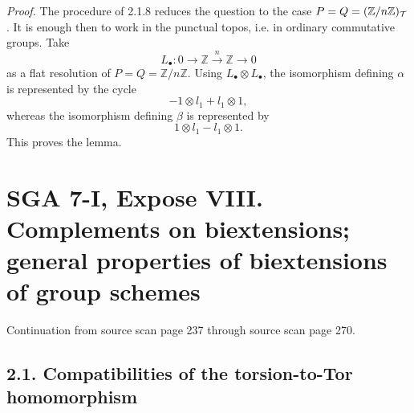 \documentclass[11pt]{article}
\providecommand{\Spec}{\operatorname{Spec}}
\providecommand{\Pic}{\operatorname{Pic}}
\providecommand{\Tor}{\operatorname{Tor}}
\providecommand{\Ker}{\operatorname{Ker}}
\providecommand{\Z}{\mathbb Z}
\providecommand{\Q}{\mathbb Q}
\providecommand{\Ql}{\mathbb Q_\ell}
\providecommand{\Zl}{\mathbb Z_\ell}
\providecommand{\Gm}{\mathbb G_m}
\providecommand{\Hom}{\operatorname{Hom}}
\providecommand{\Ext}{\operatorname{Ext}}
\providecommand{\id}{\operatorname{id}}
\begin{document}
\emph{Proof.}  The procedure of 2.1.8 reduces the question to the case \(P=Q=(\mathbb Z/n\mathbb Z)_\mathcal T\).  It is enough then to work in the punctual topos, i.e. in ordinary commutative groups.  Take
\[
        L_\bullet:0\longrightarrow\mathbb Z\xrightarrow{n}\mathbb Z\longrightarrow0
\]
as a flat resolution of \(P=Q=\mathbb Z/n\mathbb Z\).  Using \(L_\bullet\otimes L_\bullet\), the isomorphism defining \(\alpha\) is represented by the cycle
\[
        -1\otimes l_1+l_1\otimes1,
\]
whereas the isomorphism defining \(\beta\) is represented by
\[
        1\otimes l_1-l_1\otimes1.
\]
This proves the lemma.



\providecommand{\Tate}{\mathrm T}
\providecommand{\Vtate}{\mathrm V}
\providecommand{\Biext}{\operatorname{Biext}}
\providecommand{\BIEXT}{\operatorname{BIEXT}}
\providecommand{\Ext}{\operatorname{Ext}}
\providecommand{\Tor}{\operatorname{Tor}}
\providecommand{\Hom}{\operatorname{Hom}}
\providecommand{\Coker}{\operatorname{Coker}}
\providecommand{\Spec}{\operatorname{Spec}}
\providecommand{\Pic}{\operatorname{Pic}}
\providecommand{\Ker}{\operatorname{Ker}}
\providecommand{\Gm}{\mathbb G_m}
\providecommand{\Ga}{\mathbb G_a}
\providecommand{\Z}{\mathbb Z}
\providecommand{\Q}{\mathbb Q}
\providecommand{\Ql}{\mathbb Q_\ell}
\providecommand{\Zl}{\mathbb Z_\ell}
\providecommand{\muN}{\boldsymbol\mu}
\providecommand{\nr}{\mathrm{nr}}
\providecommand{\ab}{\mathrm{ab}}
\providecommand{\tr}{\operatorname{tr}}
\providecommand{\id}{\mathrm{id}}


\section*{SGA 7-I, Expose VIII. Complements on biextensions; general properties of biextensions of group schemes}
\begin{center}
Continuation from source scan page 237 through source scan page 270.
\end{center}

\subsection*{2.1. Compatibilities of the torsion-to-Tor homomorphism}
\end{document}
